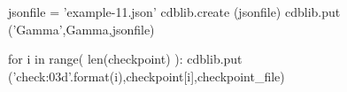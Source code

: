 \documentclass[12pt]{cdblatex}
\begin{document}
\clearpage


\begin{cadabra}
   jsonfile = 'example-11.json'
   cdblib.create (jsonfile)
   cdblib.put ('Gamma',Gamma,jsonfile)
\end{cadabra}

\bgroup
{}
\begin{cadabra}
   for i in range( len(checkpoint) ):
      cdblib.put ('check{:03d}'.format(i),checkpoint[i],checkpoint_file)
\end{cadabra}
\egroup
\end{document}
